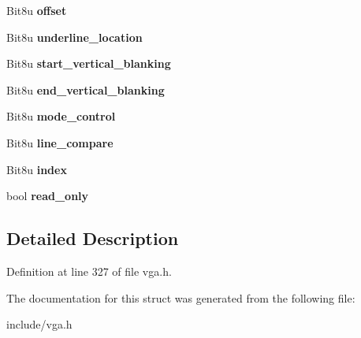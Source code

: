\begin{DoxyCompactItemize}
\item 
\hypertarget{structVGA__Crtc_a4924ee33276c5db26c158fdf870a6dd8}{Bit8u {\bfseries offset}}\label{structVGA__Crtc_a4924ee33276c5db26c158fdf870a6dd8}

\item 
\hypertarget{structVGA__Crtc_a2219c487b03bb85f3ee0588f98d1d6a6}{Bit8u {\bfseries underline\-\_\-location}}\label{structVGA__Crtc_a2219c487b03bb85f3ee0588f98d1d6a6}

\item 
\hypertarget{structVGA__Crtc_a05e8dd8080f625dceb9b0f4b3306a346}{Bit8u {\bfseries start\-\_\-vertical\-\_\-blanking}}\label{structVGA__Crtc_a05e8dd8080f625dceb9b0f4b3306a346}

\item 
\hypertarget{structVGA__Crtc_a85198ae7825925a3350637af0e91ddc9}{Bit8u {\bfseries end\-\_\-vertical\-\_\-blanking}}\label{structVGA__Crtc_a85198ae7825925a3350637af0e91ddc9}

\item 
\hypertarget{structVGA__Crtc_a4786b1dec0548282000ee6842cdc818f}{Bit8u {\bfseries mode\-\_\-control}}\label{structVGA__Crtc_a4786b1dec0548282000ee6842cdc818f}

\item 
\hypertarget{structVGA__Crtc_a5a1744696d3efa6453e94c7283df9cb6}{Bit8u {\bfseries line\-\_\-compare}}\label{structVGA__Crtc_a5a1744696d3efa6453e94c7283df9cb6}

\item 
\hypertarget{structVGA__Crtc_a25c4b8626ae66354a428340e0cfbc231}{Bit8u {\bfseries index}}\label{structVGA__Crtc_a25c4b8626ae66354a428340e0cfbc231}

\item 
\hypertarget{structVGA__Crtc_a4775a262d32dd75cede031b15845a1eb}{bool {\bfseries read\-\_\-only}}\label{structVGA__Crtc_a4775a262d32dd75cede031b15845a1eb}

\end{DoxyCompactItemize}


\subsection{Detailed Description}


Definition at line 327 of file vga.\-h.



The documentation for this struct was generated from the following file\-:\begin{DoxyCompactItemize}
\item 
include/vga.\-h\end{DoxyCompactItemize}

